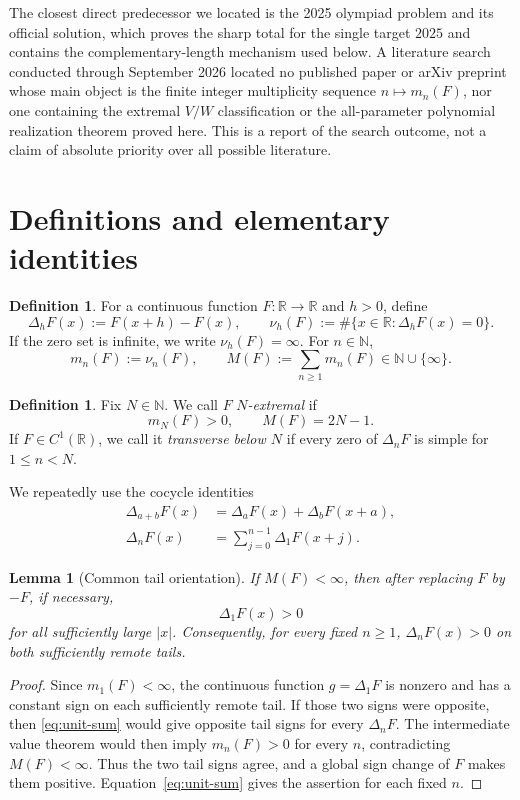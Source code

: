 \documentclass[11pt]{article}
\newtheorem{lemma}[theorem]{Lemma}
\theoremstyle{definition}
\newtheorem{definition}[theorem]{Definition}
\theoremstyle{remark}
\newcommand{\R}{\mathbb{R}}
\newcommand{\N}{\mathbb{N}}
\begin{document}
The closest direct predecessor we located is the 2025 olympiad problem and
its official solution, which proves the sharp total for the single target
\(2025\) and contains the complementary-length mechanism used below.
A literature search conducted through September 2026 located no published
paper or arXiv preprint whose main object is the finite integer multiplicity
sequence \(n\mapsto m_n(F)\), nor one containing the extremal \(V/W\)
classification or the all-parameter polynomial realization theorem proved
here.  This is a report of the search outcome, not a claim of absolute
priority over all possible literature.

\section{Definitions and elementary identities}

\begin{definition}
For a continuous function \(F:\R\to\R\) and \(h>0\), define
\[
\Delta_hF(x):=F(x+h)-F(x),
\qquad
\nu_h(F):=\#\{x\in\R:\Delta_hF(x)=0\}.
\]
If the zero set is infinite, we write \(\nu_h(F)=\infty\).
For \(n\in\N\),
\[
m_n(F):=\nu_n(F),
\qquad
M(F):=\sum_{n\ge1}m_n(F)\in\N\cup\{\infty\}.
\]
\end{definition}

\begin{definition}
Fix \(N\in\N\).  We call \(F\) \emph{\(N\)-extremal} if
\[
m_N(F)>0,\qquad M(F)=2N-1.
\]
If \(F\in C^1(\R)\), we call it \emph{transverse below \(N\)} if every
zero of \(\Delta_nF\) is simple for \(1\le n<N\).
\end{definition}

We repeatedly use the cocycle identities
\begin{align}
\Delta_{a+b}F(x)
&=\Delta_aF(x)+\Delta_bF(x+a), \label{eq:cocycle}\\
\Delta_nF(x)
&=\sum_{j=0}^{n-1}\Delta_1F(x+j). \label{eq:unit-sum}
\end{align}

\begin{lemma}[Common tail orientation]\label{lem:tails}
If \(M(F)<\infty\), then after replacing \(F\) by \(-F\), if necessary,
\[
\Delta_1F(x)>0
\]
for all sufficiently large \(|x|\).  Consequently, for every fixed
\(n\ge1\), \(\Delta_nF(x)>0\) on both sufficiently remote tails.
\end{lemma}

\begin{proof}
Since \(m_1(F)<\infty\), the continuous function
\(g=\Delta_1F\) is nonzero and has a constant sign on each sufficiently
remote tail.  If those two signs were opposite, then
\eqref{eq:unit-sum} would give opposite tail signs for every
\(\Delta_nF\).  The intermediate value theorem would then imply
\(m_n(F)>0\) for every \(n\), contradicting \(M(F)<\infty\).
Thus the two tail signs agree, and a global sign change of \(F\) makes
them positive.  Equation~\eqref{eq:unit-sum} gives the assertion for
each fixed \(n\).
\end{proof}
\end{document}
